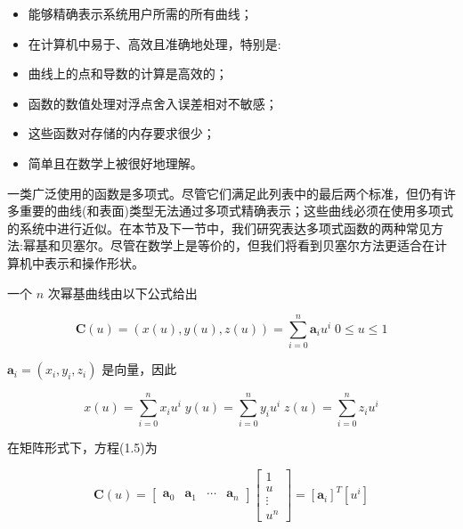 \documentclass[../main.tex]{subfiles}
\begin{document}
\begin{itemize}
\item 能够精确表示系统用户所需的所有曲线；
\end{itemize}

\begin{itemize}
\item 在计算机中易于、高效且准确地处理，特别是:
\end{itemize}

\begin{itemize}
\item 曲线上的点和导数的计算是高效的；
\end{itemize}

\begin{itemize}
\item 函数的数值处理对浮点舍入误差相对不敏感；
\end{itemize}

\begin{itemize}
\item 这些函数对存储的内存要求很少；
\end{itemize}

\begin{itemize}
\item 简单且在数学上被很好地理解。
\end{itemize}

一类广泛使用的函数是多项式。尽管它们满足此列表中的最后两个标准，但仍有许多重要的曲线(和表面)类型无法通过多项式精确表示；这些曲线必须在使用多项式的系统中进行近似。在本节及下一节中，我们研究表达多项式函数的两种常见方法:幂基和贝塞尔。尽管在数学上是等价的，但我们将看到贝塞尔方法更适合在计算机中表示和操作形状。

一个 \(n\) 次幂基曲线由以下公式给出

\[
\mathbf{C}\left( u\right)  = \left( {x\left( u\right) ,y\left( u\right) ,z\left( u\right) }\right)  = \mathop{\sum }\limits_{{i = 0}}^{n}{\mathbf{a}}_{i}{u}^{i}\;0 \leq  u \leq  1 \tag{1.5}
\]

\({\mathbf{a}}_{i} = \left( {{x}_{i},{y}_{i},{z}_{i}}\right)\) 是向量，因此

\[
x\left( u\right)  = \mathop{\sum }\limits_{{i = 0}}^{n}{x}_{i}{u}^{i}\;y\left( u\right)  = \mathop{\sum }\limits_{{i = 0}}^{n}{y}_{i}{u}^{i}\;z\left( u\right)  = \mathop{\sum }\limits_{{i = 0}}^{n}{z}_{i}{u}^{i}
\]

在矩阵形式下，方程(1.5)为

\[
\mathbf{C}\left( u\right)  = \left\lbrack  \begin{array}{llll} {\mathbf{a}}_{0} & {\mathbf{a}}_{1} & \cdots & {\mathbf{a}}_{n} \end{array}\right\rbrack  \left\lbrack  \begin{matrix} 1 \\  u \\  \vdots \\  {u}^{n} \end{matrix}\right\rbrack   = {\left\lbrack  {\mathbf{a}}_{i}\right\rbrack  }^{T}\left\lbrack  {u}^{i}\right\rbrack   \tag{1.6}
\]
\end{document}
